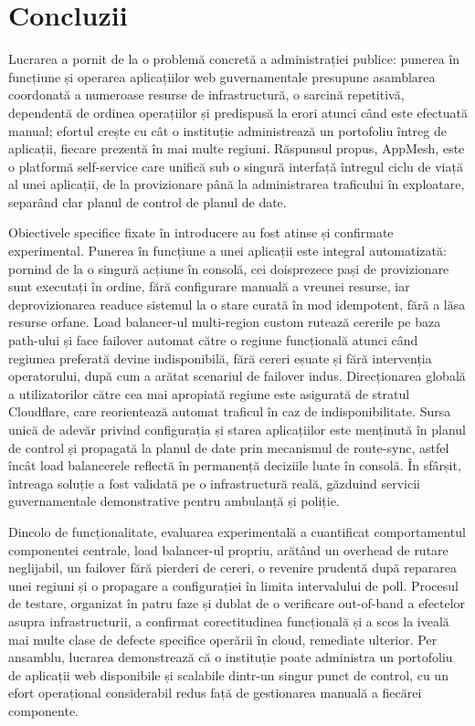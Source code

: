 \documentclass[12pt,a4paper]{report}
\begin{document}
\section{Concluzii}
Lucrarea a pornit de la o problemă concretă a administrației publice: punerea în funcțiune și operarea aplicațiilor web guvernamentale presupune asamblarea coordonată a numeroase resurse de infrastructură, o sarcină repetitivă, dependentă de ordinea operațiilor și predispusă la erori atunci când este efectuată manual; efortul crește cu cât o instituție administrează un portofoliu întreg de aplicații, fiecare prezentă în mai multe regiuni. Răspunsul propus, AppMesh, este o platformă self-service care unifică sub o singură interfață întregul ciclu de viață al unei aplicații, de la provizionare până la administrarea traficului în exploatare, separând clar planul de control de planul de date.

Obiectivele specifice fixate în introducere au fost atinse și confirmate experimental. Punerea în funcțiune a unei aplicații este integral automatizată: pornind de la o singură acțiune în consolă, cei doisprezece pași de provizionare sunt executați în ordine, fără configurare manuală a vreunei resurse, iar deprovizionarea readuce sistemul la o stare curată în mod idempotent, fără a lăsa resurse orfane. Load balancer-ul multi-region custom rutează cererile pe baza path-ului și face failover automat către o regiune funcțională atunci când regiunea preferată devine indisponibilă, fără cereri eșuate și fără intervenția operatorului, după cum a arătat scenariul de failover indus. Direcționarea globală a utilizatorilor către cea mai apropiată regiune este asigurată de stratul Cloudflare, care reorientează automat traficul în caz de indisponibilitate. Sursa unică de adevăr privind configurația și starea aplicațiilor este menținută în planul de control și propagată la planul de date prin mecanismul de route-sync, astfel încât load balancerele reflectă în permanență deciziile luate în consolă. În sfârșit, întreaga soluție a fost validată pe o infrastructură reală, găzduind servicii guvernamentale demonstrative pentru ambulanță și poliție.

Dincolo de funcționalitate, evaluarea experimentală a cuantificat comportamentul componentei centrale, load balancer-ul propriu, arătând un overhead de rutare neglijabil, un failover fără pierderi de cereri, o revenire prudentă după repararea unei regiuni și o propagare a configurației în limita intervalului de poll. Procesul de testare, organizat în patru faze și dublat de o verificare out-of-band a efectelor asupra infrastructurii, a confirmat corectitudinea funcțională și a scos la iveală mai multe clase de defecte specifice operării în cloud, remediate ulterior. Per ansamblu, lucrarea demonstrează că o instituție poate administra un portofoliu de aplicații web disponibile și scalabile dintr-un singur punct de control, cu un efort operațional considerabil redus față de gestionarea manuală a fiecărei componente.
\end{document}
